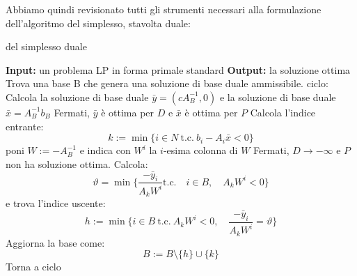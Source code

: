 \documentclass[a4paper,11pt]{article}
\begin{document}
Abbiamo quindi revisionato tutti gli strumenti necessari alla formulazione dell'algoritmo del simplesso, stavolta duale:
\begin{algorithm}[H]
\caption{del simplesso duale}
\begin{algorithmic}
	\STATE \textbf{Input:} un problema LP in forma primale standard
	\STATE \textbf{Output:} la soluzione ottima 
	\STATE Trova una base B che genera una soluzione di base duale ammissibile.
	\STATE \textsf{ciclo:}
	\STATE Calcola la soluzione di base duale $\bar{y} = (cA_B^{-1}, 0)$ e la soluzione di base duale $\bar{x} = A_B^{-1}b_B$
		\STATE Fermati, $\bar{y}$ è ottima per $D$ e $\bar{x}$ è ottima per $P$
	\ELSE
		\STATE Calcola l'indice entrante: 
		$$
		k := \min\{ i \in N \ \text{t.c.} \ b_i - A_i \bar{x} < 0 \}
		$$
		poni $W := -A_B^{-1}$ e indica con $W^i$ la $i$-esima colonna di $W$
	\ENDIF
		\STATE Fermati, $D \rightarrow -\infty$ e $P$ non ha soluzione ottima.
	\ELSE
		\STATE Calcola:
		$$
		\vartheta = \min\{ \frac{-\bar{y}_i}{A_kW^i} \text{t.c.} \quad i \in B, \quad A_k W^i < 0 \}
		$$
		e trova l'indice uscente: 
		$$ 
		h := \min\{ i \in B \ \text{t.c.} \ A_k W^i < 0, \quad \frac{-\bar{y}_i}{A_kW^i} = \vartheta \}	
		$$
	\ENDIF
	\STATE Aggiorna la base come:
	$$
	B := B \setminus \{h\} \cup \{k\}
	$$
	\STATE Torna a \textsf{ciclo}
\end{algorithmic}
\end{algorithm}
\end{document}
